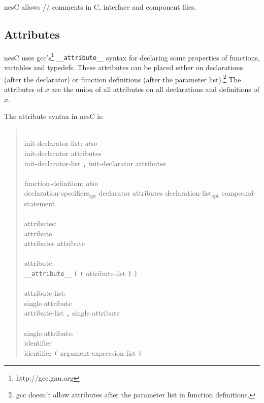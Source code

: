 \documentclass[11pt,letterpaper]{article}
\newcommand{\kw}[1]{{\tt #1}}
\newcommand{\nesc}{nesC\xspace}
\newcommand{\opt}{$_{\mbox{opt}}$\xspace}
\newcommand{\grammarshift}{\vspace*{-.7cm}}
\newcommand{\grammarindent}{\hspace*{2cm}\= \\ \kill}
\begin{document}
\nesc allows // comments in C, interface and component files.

\subsection{Attributes}
\label{sec:attributes}

\nesc uses gcc's\footnote{http://gcc.gnu.org} \kw{\_\_attribute\_\_} syntax
for declaring some properties of functions, variables and typedefs. These
attributes can be placed either on declarations (after the declarator) or
function definitions (after the parameter list).\footnote{gcc doesn't
allow attributes after the parameter list in function definitions.} The
attributes of $x$ are the union of all attributes on all declarations and
definitions of $x$.

The attribute syntax in \nesc is:
\begin{quote} \grammarshift \em \begin{tabbing}
\grammarindent
init-declarator-list: \emph{also}\\
\>	init-declarator attributes\\
\>	init-declarator-list \kw{,} init-declarator attributes\\
\\
function-definition: \emph{also}\\
\>	declaration-specifiers\opt declarator attributes declaration-list\opt compound-statement\\
\\
attributes:\\
\>	attribute\\
\>	attributes attribute\\
\\
attribute:\\
\>	\kw{\_\_attribute\_\_} \kw{(} \kw{(} attribute-list \kw{)} \kw{)}\\
\\
attribute-list:\\
\>	single-attribute\\
\>	attribute-list \kw{,} single-attribute\\
\\
single-attribute:\\
\>	identifier\\
\>	identifier \kw{(} argument-expression-list \kw{)}\\
\end{tabbing} \end{quote}
\end{document}
